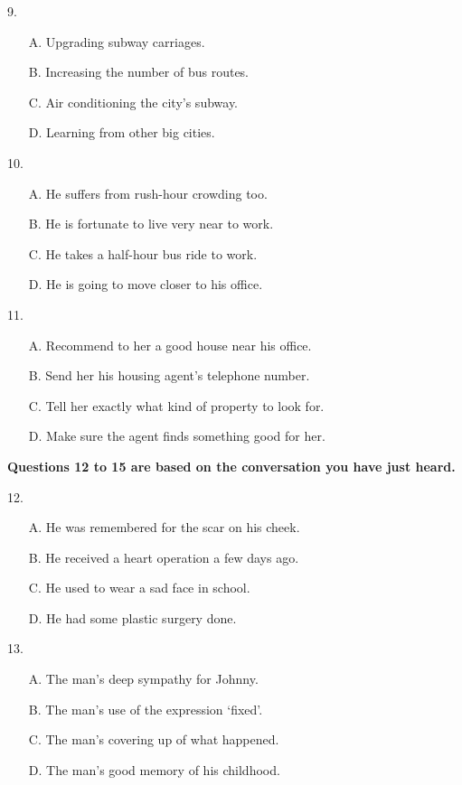 \documentclass[UTF8,11pt]{ctexart}
\begin{document}
9.


\begin{itemize}[leftmargin=2em,itemsep=.2em,topsep=.4em]\item[A.] Upgrading subway carriages.
\item[B.] Increasing the number of bus routes.
\item[C.] Air conditioning the city’s subway.
\item[D.] Learning from other big cities.
\end{itemize}

10.


\begin{itemize}[leftmargin=2em,itemsep=.2em,topsep=.4em]\item[A.] He suffers from rush-hour crowding too.
\item[B.] He is fortunate to live very near to work.
\item[C.] He takes a half-hour bus ride to work.
\item[D.] He is going to move closer to his office.
\end{itemize}

11.


\begin{itemize}[leftmargin=2em,itemsep=.2em,topsep=.4em]\item[A.] Recommend to her a good house near his office.
\item[B.] Send her his housing agent’s telephone number.
\item[C.] Tell her exactly what kind of property to look for.
\item[D.] Make sure the agent finds something good for her.
\end{itemize}

\textbf{Questions 12 to 15 are based on the conversation you have just heard.}


12.


\begin{itemize}[leftmargin=2em,itemsep=.2em,topsep=.4em]\item[A.] He was remembered for the scar on his cheek.
\item[B.] He received a heart operation a few days ago.
\item[C.] He used to wear a sad face in school.
\item[D.] He had some plastic surgery done.
\end{itemize}

13.


\begin{itemize}[leftmargin=2em,itemsep=.2em,topsep=.4em]\item[A.] The man’s deep sympathy for Johnny.
\item[B.] The man’s use of the expression ‘fixed’.
\item[C.] The man’s covering up of what happened.
\item[D.] The man’s good memory of his childhood.
\end{itemize}
\end{document}
